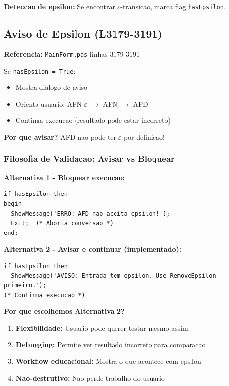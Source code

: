 \documentclass[12pt,a4paper]{article}
\begin{document}
\textbf{Deteccao de epsilon:} Se encontrar $\varepsilon$-transicao, marca flag \texttt{hasEpsilon}.

\subsection{Aviso de Epsilon (L3179-3191)}

\textbf{Referencia:} \texttt{MainForm.pas} linhas 3179-3191

Se \texttt{hasEpsilon = True}:
\begin{itemize}
    \item Mostra dialogo de aviso
    \item Orienta usuario: AFN-$\varepsilon$ $\rightarrow$ AFN $\rightarrow$ AFD
    \item Continua execucao (resultado pode estar incorreto)
\end{itemize}

\textbf{Por que avisar?} AFD nao pode ter $\varepsilon$ por definicao!

\subsubsection{Filosofia de Validacao: Avisar vs Bloquear}

\textbf{Alternativa 1 - Bloquear execucao:}
\begin{lstlisting}[style=pascal]
if hasEpsilon then
begin
  ShowMessage('ERRO: AFD nao aceita epsilon!');
  Exit;  (* Aborta conversao *)
end;
\end{lstlisting}

\textbf{Alternativa 2 - Avisar e continuar (implementado):}
\begin{lstlisting}[style=pascal]
if hasEpsilon then
  ShowMessage('AVISO: Entrada tem epsilon. Use RemoveEpsilon primeiro.');
(* Continua execucao *)
\end{lstlisting}

\textbf{Por que escolhemos Alternativa 2?}
\begin{enumerate}
    \item \textbf{Flexibilidade:} Usuario pode querer testar mesmo assim
    \item \textbf{Debugging:} Permite ver resultado incorreto para comparacao
    \item \textbf{Workflow educacional:} Mostra o que acontece com epsilon
    \item \textbf{Nao-destrutivo:} Nao perde trabalho do usuario
\end{enumerate}
\end{document}
